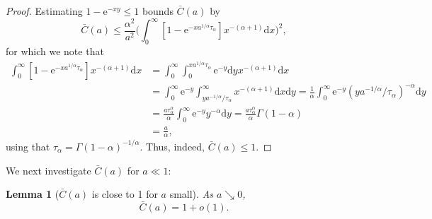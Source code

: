 \documentclass[ twocolumn,
 amsmath,amssymb,
 aps, pre, amsthm, amsfonts,
]{revtex4-2}
\newtheorem{lemma}{Lemma}
\newcommand{\e}{\mathrm{e}}
\newcommand{\nn}{\nonumber}
\begin{document}
\begin{proof}
    Estimating $1-\e^{-xy}\leq 1$ bounds $\bar{C}(a)$ by
    \begin{equation}
        \bar{C}(a) \leq \frac{\alpha^2}{a^2} \Big(\int_{0}^{\infty} [1-\e^{-xa^{1/\alpha} {\tau_\alpha}}]x^{-(\alpha+1)}
	{\mathrm d}x\Big)^2,
    \end{equation}
for which we note that
\begin{align}
    \label{single-integral}
	\int_{0}^{\infty} [1-\e^{-xa^{1/\alpha} {\tau_\alpha}}]x^{-(\alpha+1)}
	{\mathrm d}x
	&=\int_{0}^{\infty} \int_0^{xa^{1/\alpha} {\tau_\alpha}} \e^{-y} {\mathrm d}y x^{-(\alpha+1)}
	{\mathrm d}x \\
	&=\int_{0}^{\infty} \e^{-y} \int_{ya^{-1/\alpha}/{\tau_\alpha}}^{\infty} x^{-(\alpha+1)}{\mathrm d}x
	{\mathrm d}y
	=\frac{1}{\alpha} \int_{0}^{\infty} \e^{-y} (ya^{-1/\alpha}/{\tau_\alpha})^{-\alpha}{\mathrm d}y\nn\\
    &=\frac{a\tau_\alpha^{\alpha}}{\alpha} \int_{0}^{\infty} \e^{-y} y^{-\alpha}{\mathrm d}y
	=\frac{a\tau_\alpha^{\alpha}}{\alpha}\Gamma(1-\alpha) \nn\\
    & =\frac{a}{\alpha},\nn
\end{align}
using that ${\tau_\alpha}=\Gamma(1-\alpha)^{-1/\alpha}$. Thus, indeed, $\bar{C}(a)\leq 1$.
\end{proof}

We next investigate $\bar{C}(a)$ for $a\ll 1$:
\begin{lemma}[$\bar{C}(a)$ is close to 1 for $a$ small]
\label{lem-annealed-small-a}
As $a\searrow 0$,
	\begin{equation}
	    \bar{C}(a)=1+o(1).
	\end{equation}
\end{lemma} 
\end{document}
